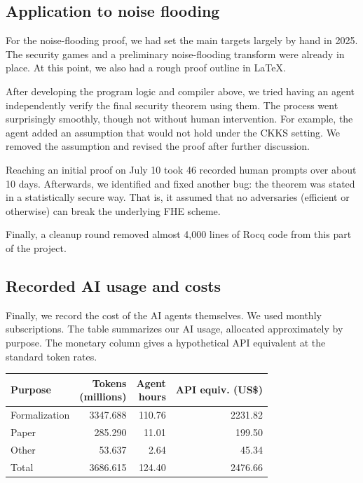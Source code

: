 \subsection{Application to noise flooding}

For the noise-flooding proof, we had set the main targets largely by hand in 2025.
The security games and a preliminary noise-flooding transform were already in place.
At this point, we also had a rough proof outline in LaTeX.

After developing the program logic and compiler above,
we tried having an agent independently verify the final security theorem using them.
The process went surprisingly smoothly, though not without human intervention.
For example, the agent added an assumption that would not hold under the CKKS setting.
We removed the assumption and revised the proof after further discussion.

Reaching an initial proof on July 10 took 46 recorded human prompts over about 10 days.
Afterwards, we identified and fixed another bug:
the theorem was stated in a statistically secure way.
That is, it assumed that no adversaries (efficient or otherwise) can break the underlying FHE scheme.

Finally, a cleanup round removed almost 4,000 lines of Rocq code from this part of the project.

\subsection{Recorded AI usage and costs}
\label{app:ai-usage-records}

Finally, we record the cost of the AI agents themselves.
We used monthly subscriptions.
The table summarizes our AI usage, allocated approximately by purpose.
The monetary column gives a hypothetical API equivalent at the standard token rates.

\begin{center}
\begingroup
\small
\setlength{\tabcolsep}{3pt}
\begin{tabular}{lrrr}
\toprule
Purpose & \shortstack{Tokens\\(millions)} &
\shortstack{Agent\\hours} & \shortstack{API equiv.\\(US\$)} \\
\midrule
Formalization & 3347.688 & 110.76 & 2231.82 \\
Paper         &  285.290 &  11.01 &  199.50 \\
Other         &   53.637 &   2.64 &   45.34 \\
\midrule
Total         & 3686.615 & 124.40 & 2476.66 \\
\bottomrule
\end{tabular}
\endgroup
\end{center}

